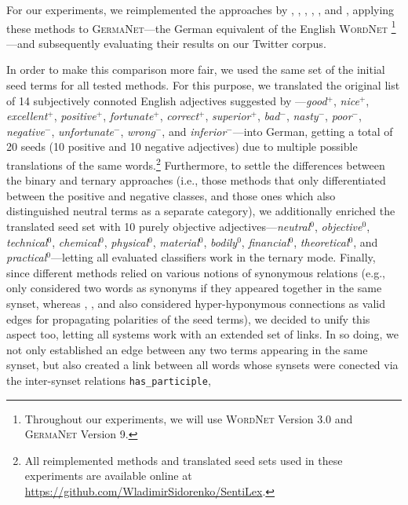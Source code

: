 For our experiments, we reimplemented the approaches by \citet{Hu:04},
\citet{Blair-Goldensohn:08}, \citet{Kim:04,Kim:06}, \citet{Esuli:06c},
\citet{Rao:09}, and \citet{Awadallah:10}, applying these methods to
\textsc{GermaNet}---the German equivalent of the English
\textsc{WordNet} \cite{Hamp:97}\footnote{Throughout our experiments,
  we will use \textsc{WordNet} Version 3.0 and \textsc{GermaNet}
  Version 9.}---and subsequently evaluating their results on our
Twitter corpus.

In order to make this comparison more fair, we used the same set of
the initial seed terms for all tested methods.  For this purpose, we
translated the original list of 14 subjectively connoted English
adjectives suggested by \citet{Turney:03}---\emph{good}$^+$,
\emph{nice}$^+$, \emph{excellent}$^+$, \emph{positive}$^+$,
\emph{fortunate}$^+$, \emph{correct}$^+$, \emph{superior}$^+$,
\emph{bad}$^-$, \emph{nasty}$^-$, \emph{poor}$^-$,
\emph{negative}$^-$, \emph{unfortunate}$^-$, \emph{wrong}$^-$, and
\emph{inferior}$^-$---into German, getting a total of 20 seeds (10
positive and 10 negative adjectives) due to multiple possible
translations of the same words.\footnote{All reimplemented methods and
  translated seed sets used in these experiments are available online
  at \url{https://github.com/WladimirSidorenko/SentiLex}.}
Furthermore, to settle the differences between the binary and ternary
approaches (i.e., those methods that only differentiated between the
positive and negative classes, and those ones which also distinguished
neutral terms as a separate category), we additionally enriched the
translated seed set with 10 purely objective
adjectives---\emph{neutral}$^0$, \emph{objective}$^0$,
\emph{technical}$^0$, \emph{chemical}$^0$, \emph{physical}$^0$,
\emph{material}$^0$, \emph{bodily}$^0$, \emph{financial}$^0$,
\emph{theoretical}$^0$, and \emph{practical}$^0$---letting all
evaluated classifiers work in the ternary mode.  Finally, since
different methods relied on various notions of synonymous relations
(e.g., \citet{Hu:04} only considered two words as synonyms if they
appeared together in the same synset, whereas \citet{Esuli:06c},
\citet{Rao:09}, and \citet{Awadallah:10} also considered
hyper-hyponymous connections as valid edges for propagating polarities
of the seed terms), we decided to unify this aspect too, letting all
systems work with an extended set of links.  In so doing, we not only
established an edge between any two terms appearing in the same
synset, but also created a link between all words whose synsets were
conected via the inter-synset relations \texttt{has\_participle},
